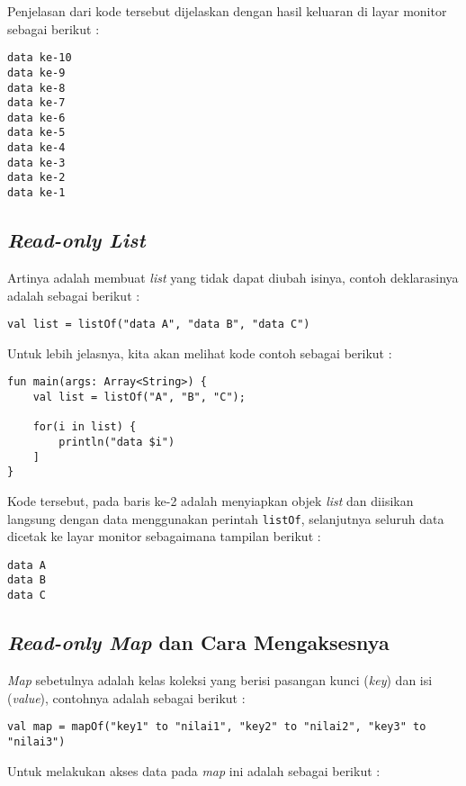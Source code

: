 Penjelasan dari kode tersebut dijelaskan dengan hasil keluaran di layar monitor sebagai berikut :

\begin{lstlisting}
data ke-10
data ke-9
data ke-8
data ke-7
data ke-6
data ke-5
data ke-4
data ke-3
data ke-2
data ke-1
\end{lstlisting}

\subsection{\textit{Read-only List}}

Artinya adalah membuat \textit{list} yang tidak dapat diubah isinya, contoh deklarasinya adalah sebagai berikut :

\begin{lstlisting}
val list = listOf("data A", "data B", "data C")
\end{lstlisting}

Untuk lebih jelasnya, kita akan melihat kode contoh sebagai berikut :

\begin{lstlisting}
fun main(args: Array<String>) {
	val list = listOf("A", "B", "C");
	
	for(i in list) {
		println("data $i")	
	]
}
\end{lstlisting}

Kode tersebut, pada baris ke-2 adalah menyiapkan objek \textit{list} dan diisikan langsung dengan data menggunakan perintah \texttt{listOf}, selanjutnya seluruh data dicetak ke layar monitor sebagaimana tampilan berikut :

\begin{lstlisting}
data A
data B
data C
\end{lstlisting}

\subsection{\textit{Read-only Map} dan Cara Mengaksesnya}

\textit{Map} sebetulnya adalah kelas koleksi yang berisi pasangan kunci (\textit{key}) dan isi (\textit{value}), contohnya adalah sebagai berikut :

\begin{lstlisting}
val map = mapOf("key1" to "nilai1", "key2" to "nilai2", "key3" to "nilai3")
\end{lstlisting}

Untuk melakukan akses data pada \textit{map} ini adalah sebagai berikut :


